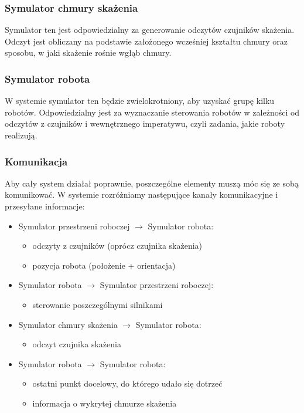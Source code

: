\documentclass[a4paper, 12pt]{article}
\begin{document}
	\subsubsection{Symulator chmury skażenia}
	Symulator ten jest odpowiedzialny za generowanie odczytów czujników skażenia. Odczyt jest obliczany na podstawie założonego wcześniej kształtu chmury oraz sposobu, w jaki skażenie rośnie wgłąb chmury.
	
	\subsubsection{Symulator robota}
	W systemie symulator ten będzie zwielokrotniony, aby uzyskać grupę kilku robotów. Odpowiedzialny jest za wyznaczanie sterowania robotów w zależności od odczytów z czujników i wewnętrznego imperatywu, czyli zadania, jakie roboty realizują.
	
	\subsubsection{Komunikacja}
	Aby cały system działał poprawnie, poszczególne elementy muszą móc się ze sobą komunikować. W systemie rozróżniamy następujące kanały komunikacyjne i przesyłane informacje:
	\begin{itemize}
	\item Symulator przestrzeni roboczej $\rightarrow$ Symulator robota:
		\begin{itemize}
		\item odczyty z czujników (oprócz czujnika skażenia)
		\item pozycja robota (położenie + orientacja)	
		\end{itemize}
	\item Symulator robota $\rightarrow$ Symulator przestrzeni roboczej:
		\begin{itemize}
		\item sterowanie poszczególnymi silnikami
		\end{itemize}
	\item Symulator chmury skażenia $\rightarrow$ Symulator robota:
		\begin{itemize}
		\item odczyt czujnika skażenia
		\end{itemize}
	\item Symulator robota $\rightarrow$ Symulator robota:
		\begin{itemize}
		\item ostatni punkt docelowy, do którego udało się dotrzeć
		\item informacja o wykrytej chmurze skażenia
		\end{itemize}
	
	\end{itemize}
	
\end{document}
